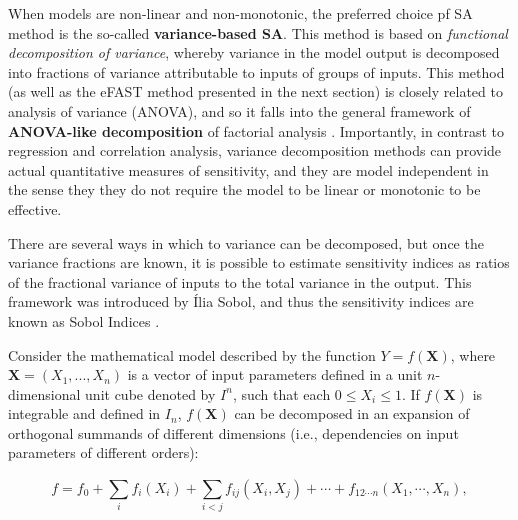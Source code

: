 \documentclass[12pt]{article}
\begin{document}
{When models are non-linear and non-monotonic, the preferred choice pf SA method is the so-called \textbf{variance-based SA}. This method is based on \textit{functional decomposition of variance}, whereby variance in the model output is decomposed into fractions of variance attributable to inputs of groups of inputs. This method (as well as the eFAST method presented in the next section) is closely related to analysis of variance (ANOVA), and so it falls into the general framework of \textbf{ANOVA-like decomposition} of factorial analysis \cite{ANOVA}. Importantly, in contrast to regression and correlation analysis, variance decomposition methods can provide actual quantitative measures of sensitivity, and they are model independent in the sense they they do not require the model to be linear or monotonic to be effective. 

There are several ways in which to variance can be decomposed, but once the variance fractions are known, it is possible to estimate sensitivity indices as ratios of the fractional variance of inputs to the total variance in the output. This framework was  introduced by \'{I}lia Sobol, and thus the sensitivity indices are known as Sobol Indices \cite{SOBOL1993,SOBOL2001}. 


Consider the mathematical model described by the function $Y=f(\mathbf{X})$, where $\mathbf{X}=(X_{1}, ..., X_{n}) $ is a vector of input parameters defined in a unit $n$-dimensional unit cube denoted by $I^{n}$, such that each $0\leq X_{i}\leq 1$. If $f(\mathbf{X})$ is integrable and defined in $I_{n}$, $f(\mathbf{X})$ can be decomposed in an expansion of  orthogonal summands of different dimensions (i.e., dependencies on input parameters of different orders):


\begin{equation}
f=f_{0}+\sum^{}_{i}f_{i}(X_{i})+\sum^{}_{i<j}f_{ij}(X_{i}, X_{j})+\cdots+f_{12\cdots n}(X_{1},\cdots, X_{n}), 
\end{equation}

}
\end{document}
